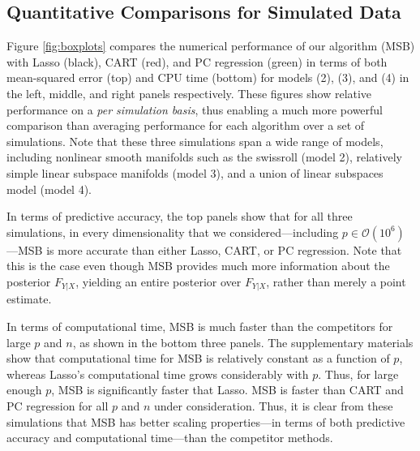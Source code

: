 \documentclass{article} %
\providecommand{\mc}[1]{\mathcal{#1}}
\begin{document}
\subsection{Quantitative Comparisons for Simulated Data} \label{sub:sim}

Figure \ref{fig:boxplots} compares the numerical performance of our algorithm (MSB) with Lasso (black), CART (red), and PC regression (green) in terms of both mean-squared error (top) and CPU time (bottom) for models (2), (3), and (4) in the left, middle, and right panels respectively. These figures show relative performance on a \emph{per simulation basis}, thus enabling a much more powerful comparison than averaging performance for each algorithm over a set of simulations.  Note that these three simulations span a wide range of models, including
nonlinear smooth manifolds such as the swissroll (model 2),
relatively simple linear subspace manifolds (model 3), 
and a union of linear subspaces model (model 4).

In terms of predictive accuracy, the top panels show that for all three simulations,  in every dimensionality that we considered---including $p \in \mc{O}(10^6)$---MSB is more accurate than either Lasso, CART, or PC regression.  Note that this is the case even though MSB provides much more information about the posterior $F_{Y|X}$, yielding an entire posterior over $F_{Y|X}$, rather than merely a point estimate.

In terms of computational time, MSB is much faster than the competitors for large $p$ and $n$, as shown in the bottom three panels.  The supplementary materials show that computational time for MSB is relatively constant as a function of $p$, whereas Lasso's computational time grows considerably with $p$.  Thus, for large enough $p$, MSB is significantly faster that Lasso.  MSB is faster than CART and PC regression for all $p$ and $n$ under consideration.  Thus, it is clear from these simulations that MSB has better scaling properties---in terms of both predictive accuracy and computational time---than the competitor methods. 
\end{document}
